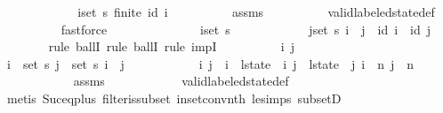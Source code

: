 \begin{isabellebody}
\ \ \ \ \isamarkupfalse%
{\isacharminus}\isanewline
\ \ \ \ \ \ \isamarkupfalse%
\ {\isachardoublequoteopen}{\isasymforall}i{\isasymin}set\ {\isacharquery}s{\isachardot}\ finite\ {\isacharparenleft}id\ i{\isacharparenright}{\isachardoublequoteclose}\isanewline
\ \ \ \ \ \ \ \ \isamarkupfalse%
\ assms\isanewline
\ \ \ \ \ \ \ \ \isamarkupfalse%
\ valid{\isacharunderscore}labeled{\isacharunderscore}state{\isacharunderscore}def\isanewline
\ \ \ \ \ \ \ \ \isamarkupfalse%
\ fastforce\isanewline
\ \ \ \ \ \ \isamarkupfalse%
\isanewline
\ \ \ \ \ \ \isamarkupfalse%
\ {\isachardoublequoteopen}{\isasymforall}i{\isasymin}set\ {\isacharquery}s{\isachardot}\isanewline
\ \ \ \ \ \ \ \ \ \ \ \ {\isasymforall}j{\isasymin}set\ {\isacharquery}s{\isachardot}\ i\ {\isasymnoteq}\ j\ {\isasymlongrightarrow}\ id\ i\ {\isasyminter}\ id\ j\ {\isacharequal}\ {\isacharbraceleft}{\isacharbraceright}{\isachardoublequoteclose}\isanewline
\ \ \ \ \ \ \isamarkupfalse%
\ {\isacharparenleft}rule\ ballI{\isacharcomma}\ rule\ ballI{\isacharcomma}\ rule\ impI{\isacharparenright}\isanewline
\ \ \ \ \ \ \ \ \isamarkupfalse%
\ i\ j\isanewline
\ \ \ \ \ \ \ \ \isamarkupfalse%
\ {\isachardoublequoteopen}i\ {\isasymin}\ set\ {\isacharquery}s{\isachardoublequoteclose}\ {\isachardoublequoteopen}j\ {\isasymin}\ set\ {\isacharquery}s{\isachardoublequoteclose}\ {\isachardoublequoteopen}i\ {\isasymnoteq}\ j{\isachardoublequoteclose}\isanewline
\ \ \ \ \ \ \ \ \isamarkupfalse%
\ \isamarkupfalse%
\ i{\isacharprime}\ j{\isacharprime}\ \ {\isachardoublequoteopen}i\ {\isacharequal}\ l{\isacharunderscore}state\ {\isacharbang}\ i{\isacharprime}{\isachardoublequoteclose}\ {\isachardoublequoteopen}j\ {\isacharequal}\ l{\isacharunderscore}state\ {\isacharbang}\ j{\isacharprime}{\isachardoublequoteclose}\ {\isachardoublequoteopen}i{\isacharprime}\ {\isasymle}\ n{\isachardoublequoteclose}\ {\isachardoublequoteopen}j{\isacharprime}\ {\isasymle}\ n{\isachardoublequoteclose}\isanewline
\ \ \ \ \ \ \ \ \ \ \isamarkupfalse%
\ assms\isanewline
\ \ \ \ \ \ \ \ \ \ \isamarkupfalse%
\ valid{\isacharunderscore}labeled{\isacharunderscore}state{\isacharunderscore}def\isanewline
\ \ \ \ \ \ \ \ \ \ \isamarkupfalse%
\ {\isacharparenleft}metis\ Suc{\isacharunderscore}eq{\isacharunderscore}plus{}\ filter{\isacharunderscore}is{\isacharunderscore}subset\ in{\isacharunderscore}set{\isacharunderscore}conv{\isacharunderscore}nth\ le{\isacharunderscore}simps{\isacharparenleft}{}{\isacharparenright}\ subsetD{\isacharparenright}\isanewline

\end{isabellebody}
